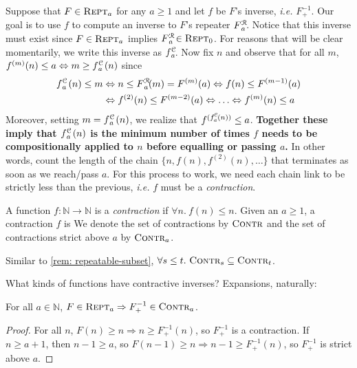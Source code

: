 Suppose that $F \in \text{\scshape{Rept}}_a$ for any $a \ge 1$ and let $f$ be $F$'s inverse, \emph{i.e.} $F^{-1}_{+}$.  Our goal is to use $f$ to compute an inverse to $F$'s repeater $\rf{F}{a}$.  Notice that this inverse must exist since $F \in \text{\scshape{Rept}}_a$ implies $\rf{F}{a} \in \repeatable_0$.  
For reasons that will be clear momentarily, we write this inverse as $\cdt{f}{a}$.  Now
fix $n$ and observe that for all $m$, $f^{(m)}(n)\le a \iff m \ge \cdt{f}{a}(n)$ since
\begin{equation} \label{eq: rf-upp-inv}
\begin{aligned}
\cdt{f}{a}(n)\le m & \iff n\le \rf{F}{a}(m) = F^{(m)}(a) \iff f(n)\le F^{(m-1)}(a) \\
& \iff f^{(2)}(n)\le F^{(m-2)}(a) \iff \ldots \iff f^{(m)}(n)\le a
\end{aligned}
\end{equation}
Moreover, setting $m = \cdt{f}{a}(n)$, we realize that $f^{(\cdt{f}{a}(n))}\le a$.  
\textbf{Together these imply that $\cdt{f}{a}(n)$ is the minimum number of times $f$ 
needs to be compositionally applied to $n$ before equalling or passing $a$.} 
In other words, count the length of the chain $\{n, f(n), f^{(2)}(n), \ldots\}$ that 
terminates as soon as we reach/pass $a$.  For this process to work, 
we need each chain link
to be strictly less than the previous, \emph{i.e.} $f$ must be a \emph{contraction}.
\begin{defn} \label{defn: contracting}
	A function $f : \mathbb{N} \to \mathbb{N}$ is a \textit{contraction} if $\forall n.~ f(n) \le n$. Given an $a \ge 1$, a contraction $f$ is  We denote the set of contractions by $\text{\scshape{Contr}}$ and the set of contractions strict above $a$ by $\text{\scshape{Contr}}_a$.
\end{defn}
\begin{rem}
	Similar to \cref{rem: repeatable-subset}, $\forall s\le t.~ \text{\scshape{Contr}}_s \subseteq \text{\scshape{Contr}}_t$.
\end{rem}
What kinds of functions have contractive inverses? Expansions, naturally:
\begin{thm} \label{thm: expansion-inv-contraction}
For all $a\in \mathbb{N}$, $F\in \text{\scshape{Rept}}_a \Rightarrow F^{-1}_+ \in \text{\scshape{Contr}}_a$.
\end{thm}
\begin{proof}
For all $n$, $F(n)\ge n \Rightarrow n \ge F^{-1}_+(n)$, so $F^{-1}_+$ is a contraction. If $n\ge a+1$, then $n-1\ge a$, so $F(n-1)\ge n \Rightarrow n-1\ge F^{-1}_+(n)$, so $F^{-1}_+$ is strict above $a$.
\end{proof}

